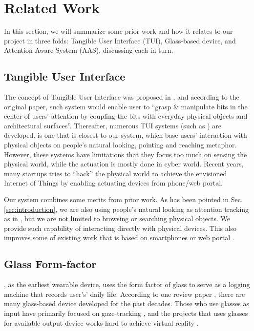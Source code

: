 \section{Related Work}
\label{sec:related-work}

In this section, we will summarize some prior work and how it relates to our project in three folds: Tangible User Interface (TUI), Glass-based device, and Attention Aware System (AAS), discussing each in turn. 

\subsection{Tangible User Interface}
\label{sec:tang-user-interf}

The concept of Tangible User Interface was proposed in \cite{Ishii:1997:TBT:258549.258715}, and according to the original paper, such system would enable user to ``grasp \& manipulate bits in the center of users' attention by coupling the bits with everyday physical objects and architectural surfaces''. Thereafter, numerous TUI systems (such as \cite{Nanayakkara:2012:EEF:2212776.2212382, Patel:2006:IPA:2094945.2094962}) are developed. \cite{Merrill:2007:ALP:1758156.1758158} is one that is closest to our system, which base users' interaction with physical objects on people's natural looking, pointing and reaching metaphor. However, these systems have limitations that they focus too much on sensing the physical world, while the actuation is mostly done in cyber world. Recent years, many startups \cite{SmartThings, NinjaBlocks, Lockitron} tries to ``hack'' the physical world to achieve the envisioned Internet of Things by enabling actuating devices from phone/web portal. 

Our system combines some merits from prior work. As has been pointed in Sec.\,\ref{sec:introduction}, we are also using people's natural looking as attention tracking as in \cite{Merrill:2007:ALP:1758156.1758158}, but we are not limited to browsing or searching physical objects. We provide such capability of interacting directly with physical devices. This also improves some of existing work that is based on smartphones or web portal \cite{SmartThings, NinjaBlocks}.

\subsection{Glass Form-factor}
\label{sec:glass-form-factor}

\cite{mann2004continuous}, as the earliest wearable device, uses the form factor of glass to serve as a logging machine that records user's’ daily life. According to one review paper \cite{morris2010emerging}, there are many glass-based device developed for the past decades. Those who use glasses as input have primarily focused on gaze-tracking \cite{Selker:2001:EGE:634067.634176, Nagamatsu:2010:MDG:1753846.1753983}, and the projects that uses glasses for available output device works hard to achieve virtual reality \cite{Lumus, GoogleGlass}.

